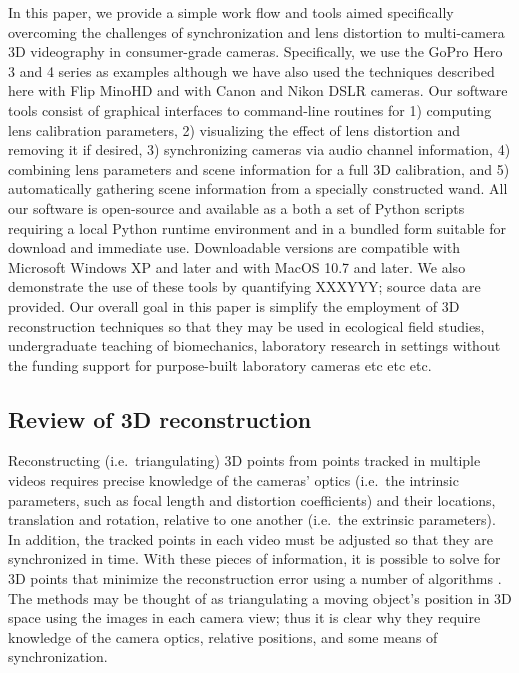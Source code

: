 \documentclass[fleqn,10pt]{wlpeerj}
\begin{document}
In this paper, we provide a simple work flow and tools aimed specifically overcoming the challenges of synchronization and lens distortion to multi-camera 3D videography in consumer-grade cameras. Specifically, we use the GoPro Hero 3 and 4 series as examples although we have also used the techniques described here with Flip MinoHD and with Canon and Nikon DSLR cameras.  Our software tools consist of graphical interfaces to command-line routines for 1) computing lens calibration parameters, 2) visualizing the effect of lens distortion and removing it if desired, 3) synchronizing cameras via audio channel information, 4) combining lens parameters and scene information for a full 3D calibration, and 5) automatically gathering scene information from a specially constructed wand. All our software is open-source and available as a both a set of Python scripts requiring a local Python runtime environment and in a bundled form suitable for download and immediate use. Downloadable versions are compatible with Microsoft Windows XP and later and with MacOS 10.7 and later. We also demonstrate the use of these tools by quantifying XXXYYY; source data are provided. Our overall goal in this paper is simplify the employment of 3D reconstruction techniques so that they may be used in ecological field studies, undergraduate teaching of biomechanics, laboratory research in settings without the funding support for purpose-built laboratory cameras etc etc etc. 

\subsection*{Review of 3D reconstruction}

Reconstructing (i.e.~triangulating) 3D points from points tracked in multiple videos requires precise knowledge of the cameras' optics (i.e.~the intrinsic parameters, such as focal length and distortion coefficients) and their locations, translation and rotation, relative to one another (i.e.~the extrinsic parameters).  In addition, the tracked points in each video must be adjusted so that they are synchronized in time.  With these pieces of information, it is possible to solve for 3D points that minimize the reconstruction error using a number of algorithms \citep{Hedrick2008, bouguet2004camera,lour09,HartleyZisserman2000}.  The methods may be thought of as triangulating a moving object's position in 3D space using the images in each camera view; thus it is clear why they require knowledge of the camera optics, relative positions, and some means of synchronization.    
\end{document}
